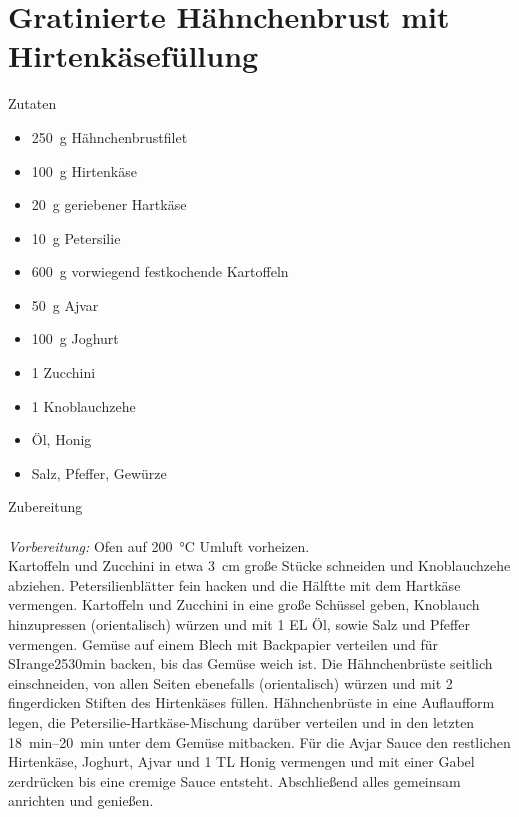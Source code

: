 \section*{Gratinierte Hähnchenbrust mit Hirtenkäsefüllung}
\ihead{}\ohead{}
\cfoot{}
{\Large Zutaten}
\begin{multicols}{2}
\begin{itemize}
    \item \SI{250}{g} Hähnchenbrustfilet
    \item \SI{100}{g} Hirtenkäse
    \item \SI{20}{g} geriebener Hartkäse
    \item \SI{10}{g} Petersilie
    \item \SI{600}{g} vorwiegend festkochende Kartoffeln
    \item \SI{50}{g} Ajvar
    \item \SI{100}{g} Joghurt
    \item \num{1} Zucchini
    \item \num{1} Knoblauchzehe
    \item Öl, Honig
    \item Salz, Pfeffer, Gewürze
\end{itemize}
\end{multicols}
\noindent
{\Large Zubereitung}\\
\\
\textit{Vorbereitung:} Ofen auf \SI{200}{\celsius} Umluft vorheizen.\\
Kartoffeln und Zucchini in etwa \SI{3}{cm} große Stücke schneiden und Knoblauchzehe abziehen.
Petersilienblätter fein hacken und die Hälftte mit dem Hartkäse vermengen.
Kartoffeln und Zucchini in eine große Schüssel geben, Knoblauch hinzupressen (orientalisch) würzen und mit \num{1} EL Öl, sowie Salz und Pfeffer vermengen. 
Gemüse auf einem Blech mit Backpapier verteilen und für SIrange{25}{30}{min} backen, bis das Gemüse weich ist.
Die Hähnchenbrüste seitlich einschneiden, von allen Seiten ebenefalls (orientalisch) würzen und mit \num{2} fingerdicken Stiften des Hirtenkäses füllen.
Hähnchenbrüste in eine Auflaufform legen, die Petersilie-Hartkäse-Mischung darüber verteilen und in den letzten \SIrange{18}{20}{min} unter dem Gemüse mitbacken. 
Für die Avjar Sauce den restlichen Hirtenkäse, Joghurt, Ajvar und \num{1} TL Honig vermengen und mit einer Gabel zerdrücken bis eine cremige Sauce entsteht. 
Abschließend alles gemeinsam anrichten und genießen. 
